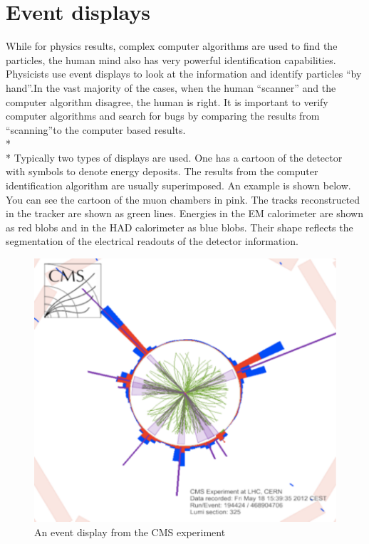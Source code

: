 \section{Event displays}
While for physics results, complex computer algorithms are used to find the particles, the human mind also has very powerful identification capabilities.  Physicists use event displays to look at the information and identify particles ``by hand''.In the vast majority of the cases, when the human ``scanner'' and the computer algorithm disagree, the human is right.  It is important to verify computer algorithms and search for bugs by comparing the results from ``scanning''to the computer based results.
\\*
\\*
Typically two types of displays are used.  One has a cartoon of the detector with symbols to denote energy deposits.  The results from the computer identification algorithm are usually superimposed.  An example is shown below.  You can see the cartoon of the muon chambers in pink.  The tracks reconstructed in the tracker are shown as green lines.  Energies in the EM calorimeter are shown as red blobs and in the HAD calorimeter as blue blobs.  Their shape reflects the segmentation of the electrical readouts of the detector information.
\begin{figure}[h]
\centering\includegraphics[scale=0.5]{./particleID/Pictures/fig2.pdf}
\caption{An event display from the CMS experiment}
\label{fig:pdgdedx}
\end{figure}
